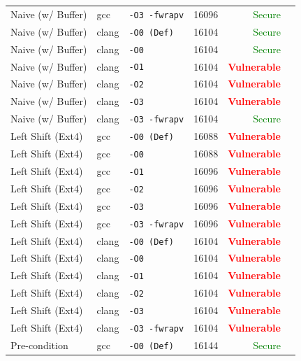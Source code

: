 \begin{table}[htbp]
\begin{tabular}{@{}lllcrl@{}}
Naive (w/ Buffer) & gcc & \texttt{-O3 -fwrapv} & 16096 & \textcolor{green}{Secure}} \\
Naive (w/ Buffer) & clang & \texttt{-O0 (Def)} & 16104 & \textcolor{green}{Secure}} \\
Naive (w/ Buffer) & clang & \texttt{-O0} & 16104 & \textcolor{green}{Secure}} \\
Naive (w/ Buffer) & clang & \texttt{-O1} & 16104 & \textbf{\textcolor{red}{Vulnerable}} \\
Naive (w/ Buffer) & clang & \texttt{-O2} & 16104 & \textbf{\textcolor{red}{Vulnerable}} \\
Naive (w/ Buffer) & clang & \texttt{-O3} & 16104 & \textbf{\textcolor{red}{Vulnerable}} \\
Naive (w/ Buffer) & clang & \texttt{-O3 -fwrapv} & 16104 & \textcolor{green}{Secure}} \\
\midrule
Left Shift (Ext4) & gcc & \texttt{-O0 (Def)} & 16088 & \textbf{\textcolor{red}{Vulnerable}} \\
Left Shift (Ext4) & gcc & \texttt{-O0} & 16088 & \textbf{\textcolor{red}{Vulnerable}} \\
Left Shift (Ext4) & gcc & \texttt{-O1} & 16096 & \textbf{\textcolor{red}{Vulnerable}} \\
Left Shift (Ext4) & gcc & \texttt{-O2} & 16096 & \textbf{\textcolor{red}{Vulnerable}} \\
Left Shift (Ext4) & gcc & \texttt{-O3} & 16096 & \textbf{\textcolor{red}{Vulnerable}} \\
Left Shift (Ext4) & gcc & \texttt{-O3 -fwrapv} & 16096 & \textbf{\textcolor{red}{Vulnerable}} \\
Left Shift (Ext4) & clang & \texttt{-O0 (Def)} & 16104 & \textbf{\textcolor{red}{Vulnerable}} \\
Left Shift (Ext4) & clang & \texttt{-O0} & 16104 & \textbf{\textcolor{red}{Vulnerable}} \\
Left Shift (Ext4) & clang & \texttt{-O1} & 16104 & \textbf{\textcolor{red}{Vulnerable}} \\
Left Shift (Ext4) & clang & \texttt{-O2} & 16104 & \textbf{\textcolor{red}{Vulnerable}} \\
Left Shift (Ext4) & clang & \texttt{-O3} & 16104 & \textbf{\textcolor{red}{Vulnerable}} \\
Left Shift (Ext4) & clang & \texttt{-O3 -fwrapv} & 16104 & \textbf{\textcolor{red}{Vulnerable}} \\
\midrule
Pre-condition & gcc & \texttt{-O0 (Def)} & 16144 & \textcolor{green}{Secure}} \\

\end{tabular}
\end{table}
